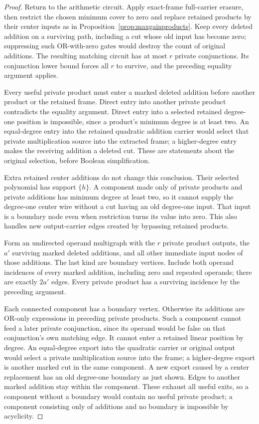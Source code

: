 \documentclass[11pt]{article}
\theoremstyle{definition}
\theoremstyle{remark}
\begin{document}
\begin{proof}
Return to the arithmetic circuit. Apply exact-frame full-carrier erasure, then restrict the chosen minimum cover to zero and replace retained products by their center inputs as in Proposition~\ref{prop:maxgainproducts}. Keep every deleted addition on a surviving path, including a cut whose old input has become zero; suppressing such OR-with-zero gates would destroy the count of original additions. The resulting matching circuit has at most $r$ private conjunctions. Its conjunction lower bound forces all $r$ to survive, and the preceding equality argument applies.

Every useful private product must enter a marked deleted addition before another product or the retained frame. Direct entry into another private product contradicts the equality argument. Direct entry into a selected retained degree-one position is impossible, since a product's minimum degree is at least two. An equal-degree entry into the retained quadratic addition carrier would select that private multiplication source into the extracted frame; a higher-degree entry makes the receiving addition a deleted cut. These are statements about the original selection, before Boolean simplification.

Extra retained center additions do not change this conclusion. Their selected polynomial has support $\{h\}$. A component made only of private products and private additions has minimum degree at least two, so it cannot supply the degree-one center wire without a cut having an old degree-one input. That input is a boundary node even when restriction turns its value into zero. This also handles new output-carrier edges created by bypassing retained products.

Form an undirected operand multigraph with the $r$ private product outputs, the $a'$ surviving marked deleted additions, and all other immediate input nodes of those additions. The last kind are boundary vertices. Include both operand incidences of every marked addition, including zero and repeated operands; there are exactly $2a'$ edges. Every private product has a surviving incidence by the preceding argument.

Each connected component has a boundary vertex. Otherwise its additions are OR-only expressions in preceding private products. Such a component cannot feed a later private conjunction, since its operand would be false on that conjunction's own matching edge. It cannot enter a retained linear position by degree. An equal-degree export into the quadratic carrier or original output would select a private multiplication source into the frame; a higher-degree export is another marked cut in the same component. A new export caused by a center replacement has an old degree-one boundary as just shown. Edges to another marked addition stay within the component. These exhaust all useful exits, so a component without a boundary would contain no useful private product; a component consisting only of additions and no boundary is impossible by acyclicity.


\end{proof}
\end{document}
